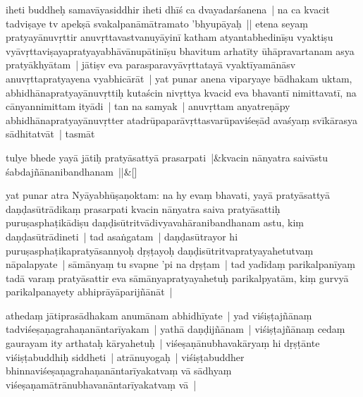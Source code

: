\documentclass[article,12pt,a4paper]{memoir}%
\newcounter{parCount}
\begin{document}
	  \pstart \leavevmode%
	iheti buddheḥ samavāyasiddhir iheti dhīś ca dvayadarśanena | na ca kvacit tadviṣaye tv apekṣā svakalpanāmātramato 'bhyupāyaḥ || \label{thakur75-64.15} etena seyaṃ pratyayānuvṛttir anuvṛttavastvanuyāyinī katham atyantabhedinīṣu vyaktiṣu vyāvṛttaviṣayapratyayabhāvānupātinīṣu bhavitum arhatīty ūhāpravartanam asya pratyākhyātam | jātiṣv eva parasparavyāvṛttatayā vyaktīyamānāsv anuvṛttapratyayena vyabhicārāt | \label{thakur75-64.19} yat punar anena viparyaye bādhakam uktam, abhidhānapratyayānuvṛttiḥ kutaścin nivṛttya kvacid eva bhavantī nimittavatī, na cānyannimittam ityādi | tan na samyak | anuvṛttam anyatreṇāpy abhidhānapratyayānuvṛtter atadrūpaparāvṛttasvarūpaviśeṣād avaśyaṃ svīkārasya sādhitatvāt | tasmāt
	{}
	\pend%
      
	    
	    \stanza[\smallbreak]
	  tulye bhede yayā jātiḥ pratyāsattyā prasarpati |&kvacin nānyatra saivāstu śabdajñānanibandhanam ||\&[\smallbreak]
	  
	  
	  

	  \pstart \leavevmode%
	\label{thakur75-64.24}yat punar atra Nyāyabhūṣaṇoktam: na hy evaṃ bhavati, yayā pratyāsattyā daṇḍasūtrādikaṃ prasarpati kvacin nānyatra saiva pratyāsattiḥ puruṣasphaṭikādiṣu daṇḍisūtritvādivyavahāranibandhanam astu, kiṃ daṇḍasūtrādineti | tad asaṅgatam | daṇḍasūtrayor hi puruṣasphaṭikapratyāsannyoḥ dṛṣṭayoḥ daṇḍisūtritvapratyayahetutvaṃ nāpalapyate | sāmānyaṃ tu svapne 'pi na dṛṣṭam | tad yadīdaṃ parikalpanīyaṃ tadā varaṃ pratyāsattir eva sāmānyapratyayahetuḥ parikalpyatām, kiṃ gurvyā parikalpanayety abhiprāyāparijñānāt |
	{}
	\pend%
      

	  \pstart \leavevmode%
	\label{thakur75-65.1} athedaṃ jātiprasādhakam anumānam abhidhīyate | yad viśiṣṭajñānaṃ tadviśeṣaṇagrahaṇanāntarīyakam | yathā daṇḍijñānam | viśiṣṭajñānaṃ cedaṃ gaurayam ity arthataḥ kāryahetuḥ | viśeṣaṇānubhavakāryaṃ hi dṛṣṭānte viśiṣṭabuddhiḥ siddheti | atrānuyogaḥ | viśiṣṭabuddher bhinnaviśeṣaṇagrahaṇanāntarīyakatvaṃ vā sādhyaṃ viśeṣaṇamātrānubhavanāntarīyakatvaṃ vā |
	{}
	\pend%
      
\end{document}
